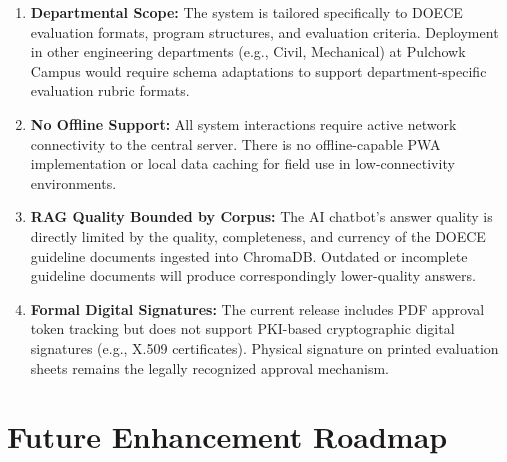 \documentclass[12pt]{report}
\begin{document}
\begin{enumerate}[leftmargin=*, label=\textbf{\arabic*.}]
  \item \textbf{Departmental Scope:} The system is tailored specifically to DOECE evaluation formats, program structures, and evaluation criteria. Deployment in other engineering departments (e.g., Civil, Mechanical) at Pulchowk Campus would require schema adaptations to support department-specific evaluation rubric formats.

  \item \textbf{No Offline Support:} All system interactions require active network connectivity to the central server. There is no offline-capable PWA implementation or local data caching for field use in low-connectivity environments.

  \item \textbf{RAG Quality Bounded by Corpus:} The AI chatbot's answer quality is directly limited by the quality, completeness, and currency of the DOECE guideline documents ingested into ChromaDB. Outdated or incomplete guideline documents will produce correspondingly lower-quality answers.

  \item \textbf{Formal Digital Signatures:} The current release includes PDF approval token tracking but does not support PKI-based cryptographic digital signatures (e.g., X.509 certificates). Physical signature on printed evaluation sheets remains the legally recognized approval mechanism.
\end{enumerate}

\section{Future Enhancement Roadmap}
\end{document}
